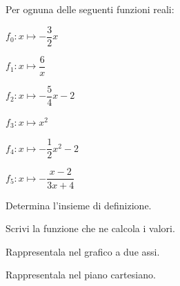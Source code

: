 \begin{esercizio}\label{ese:03.1}
Per ognuna delle seguenti funzioni reali:
\vspace{-3mm}
\begin{multicols}{3}
\begin{enumeratea}
\item $f_0: x \mapsto - \dfrac{3}{2} x$
\item $f_1: x \mapsto \dfrac{6}{x}$
\item $f_2: x \mapsto - \dfrac{5}{4} x -2$
\item $f_3: x \mapsto x^2$
\item $f_4: x \mapsto - \dfrac{1}{2} x^2 -2$
\item $f_5: x \mapsto - \dfrac{x-2}{3x+4}$
\end{enumeratea}
\end{multicols}
\begin{multicols}{2}
\begin{enumeratea}
\item Determina l'insieme di definizione.
\item Scrivi la funzione che ne calcola i valori.
\item Rappresentala nel grafico a due assi.
\item Rappresentala nel piano cartesiano.
\end{enumeratea}
\end{multicols}
\end{esercizio}


